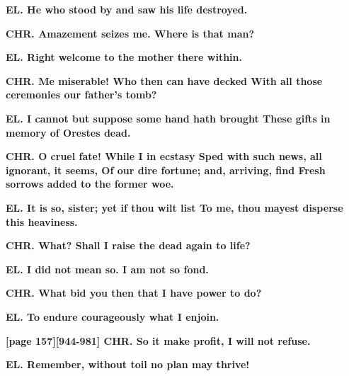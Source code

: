 \documentclass[11pt,letter]{book}
\begin{document}
\par \textbf{EL. He who stood by and saw his life destroyed.}
\par 

\par \textbf{CHR. Amazement seizes me. Where is that man?}
\par 

\par \textbf{EL. Right welcome to the mother there within.}
\par 

\par \textbf{CHR. Me miserable! Who then can have decked With all those ceremonies our father’s tomb?}
\par 

\par \textbf{EL. I cannot but suppose some hand hath brought These gifts in memory of Orestes dead.}
\par 

\par \textbf{CHR. O cruel fate! While I in ecstasy Sped with such news, all ignorant, it seems, Of our dire fortune; and, arriving, find Fresh sorrows added to the former woe.}
\par 

\par \textbf{EL. It is so, sister; yet if thou wilt list To me, thou mayest disperse this heaviness.}
\par 

\par \textbf{CHR. What? Shall I raise the dead again to life?}
\par 

\par \textbf{EL. I did not mean so. I am not so fond.}
\par 

\par \textbf{CHR. What bid you then that I have power to do?}
\par 

\par \textbf{EL. To endure courageously what I enjoin.}
\par 

\par \textbf{[page 157][944-981] CHR. So it make profit, I will not refuse.}
\par 

\par \textbf{EL. Remember, without toil no plan may thrive!}
\par 
\end{document}
